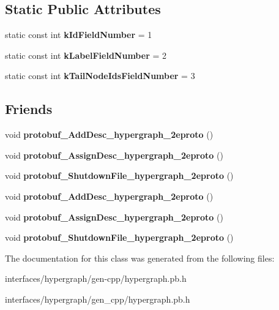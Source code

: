 \subsection*{Static Public Attributes}
\begin{DoxyCompactItemize}
\item 
\hypertarget{classHypergraph__Edge_a3ef9526f4e83b7d3b6e84b53869823ba}{
static const int {\bfseries kIdFieldNumber} = 1}
\label{classHypergraph__Edge_a3ef9526f4e83b7d3b6e84b53869823ba}

\item 
\hypertarget{classHypergraph__Edge_ae0a899443488a0d046a4ccdef8f86443}{
static const int {\bfseries kLabelFieldNumber} = 2}
\label{classHypergraph__Edge_ae0a899443488a0d046a4ccdef8f86443}

\item 
\hypertarget{classHypergraph__Edge_a93fa914d403a510e5b9e14fa529e5b35}{
static const int {\bfseries kTailNodeIdsFieldNumber} = 3}
\label{classHypergraph__Edge_a93fa914d403a510e5b9e14fa529e5b35}

\end{DoxyCompactItemize}
\subsection*{Friends}
\begin{DoxyCompactItemize}
\item 
\hypertarget{classHypergraph__Edge_aed4781a70bb54c95ce4bb1aa4f20b05c}{
void {\bfseries protobuf\_\-AddDesc\_\-hypergraph\_\-2eproto} ()}
\label{classHypergraph__Edge_aed4781a70bb54c95ce4bb1aa4f20b05c}

\item 
\hypertarget{classHypergraph__Edge_a3cbaa41d7f7b73db437c4e7d1edcb4f3}{
void {\bfseries protobuf\_\-AssignDesc\_\-hypergraph\_\-2eproto} ()}
\label{classHypergraph__Edge_a3cbaa41d7f7b73db437c4e7d1edcb4f3}

\item 
\hypertarget{classHypergraph__Edge_a424acd7e96228bbed0dba9436582d3c1}{
void {\bfseries protobuf\_\-ShutdownFile\_\-hypergraph\_\-2eproto} ()}
\label{classHypergraph__Edge_a424acd7e96228bbed0dba9436582d3c1}

\item 
\hypertarget{classHypergraph__Edge_aed4781a70bb54c95ce4bb1aa4f20b05c}{
void {\bfseries protobuf\_\-AddDesc\_\-hypergraph\_\-2eproto} ()}
\label{classHypergraph__Edge_aed4781a70bb54c95ce4bb1aa4f20b05c}

\item 
\hypertarget{classHypergraph__Edge_a3cbaa41d7f7b73db437c4e7d1edcb4f3}{
void {\bfseries protobuf\_\-AssignDesc\_\-hypergraph\_\-2eproto} ()}
\label{classHypergraph__Edge_a3cbaa41d7f7b73db437c4e7d1edcb4f3}

\item 
\hypertarget{classHypergraph__Edge_a424acd7e96228bbed0dba9436582d3c1}{
void {\bfseries protobuf\_\-ShutdownFile\_\-hypergraph\_\-2eproto} ()}
\label{classHypergraph__Edge_a424acd7e96228bbed0dba9436582d3c1}

\end{DoxyCompactItemize}


The documentation for this class was generated from the following files:\begin{DoxyCompactItemize}
\item 
interfaces/hypergraph/gen-\/cpp/hypergraph.pb.h\item 
interfaces/hypergraph/gen\_\-cpp/hypergraph.pb.h\end{DoxyCompactItemize}

